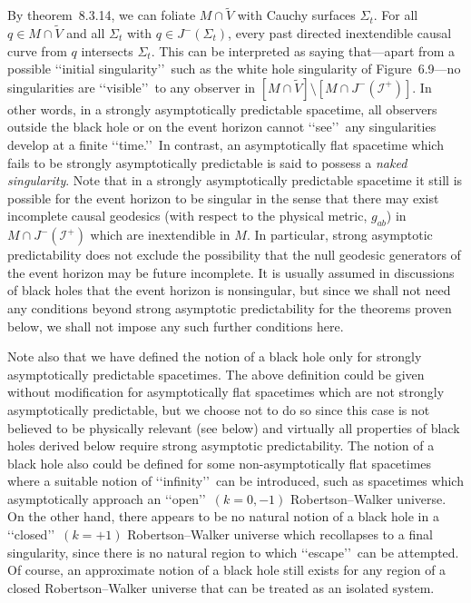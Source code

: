 By theorem~8.3.14, we can foliate \(M\cap\widetilde V\) with Cauchy surfaces
\(\Sigma_t\). For all \(q\in M\cap\widetilde V\) and all \(\Sigma_t\) with
\(q\in J^-(\Sigma_t)\), every past directed inextendible causal curve from \(q\)
intersects \(\Sigma_t\). This can be interpreted as saying that---apart from a
possible \lq\lq initial singularity\rq\rq\ such as the white hole singularity of
Figure~6.9---no singularities are \lq\lq visible\rq\rq\ to any observer in
\([M\cap\widetilde V]\setminus[M\cap J^-(\mathcal I^+)]\). In other words, in a
strongly asymptotically predictable spacetime, all observers outside the black hole
or on the event horizon cannot \lq\lq see\rq\rq\ any singularities develop at a finite
\lq\lq time.\rq\rq\ In contrast, an asymptotically flat spacetime which fails to be
strongly asymptotically predictable is said to possess a \emph{naked singularity}.
Note that in a strongly asymptotically predictable spacetime it still is possible for
the event horizon to be singular in the sense that there may exist incomplete causal
geodesics (with respect to the physical metric, \(g_{ab}\)) in
\(M\cap J^-(\mathcal I^+)\) which are inextendible in \(M\). In particular, strong
asymptotic predictability does not exclude the possibility that the null geodesic
generators of the event horizon may be future incomplete. It is usually assumed in
discussions of black holes that the event horizon is nonsingular, but since we shall
not need any conditions beyond strong asymptotic predictability for the theorems
proven below, we shall not impose any such further conditions here.

Note also that we have defined the notion of a black hole only for strongly
asymptotically predictable spacetimes. The above definition could be given without
modification for asymptotically flat spacetimes which are not strongly asymptotically
predictable, but we choose not to do so since this case is not believed to be physically
relevant (see below) and virtually all properties of black holes derived below require
strong asymptotic predictability. The notion of a black hole also could be defined for
some non-asymptotically flat spacetimes where a suitable notion of \lq\lq infinity\rq\rq\ can
be introduced, such as spacetimes which asymptotically approach an \lq\lq open\rq\rq\
\((k=0,-1)\) Robertson--Walker universe. On the other hand, there appears to be
no natural notion of a black hole in a \lq\lq closed\rq\rq\ \((k=+1)\)
Robertson--Walker universe which recollapses to a final singularity, since there is no
natural region to which \lq\lq escape\rq\rq\ can be attempted. Of course, an
approximate notion of a black hole still exists for any region of a closed
Robertson--Walker universe that can be treated as an isolated system.


